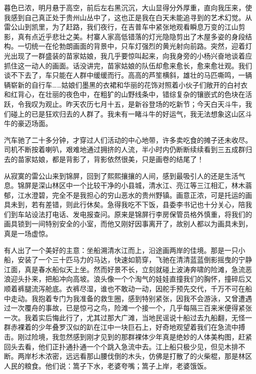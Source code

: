 \documentclass{article}
\begin{document}
暮色已浓，明月悬于高空，前后左右黑沉沉，大山显得分外厚重，直向我压来，使我感到自己真正处于贵州山丛中了，这也正是我在白天未能追寻到的艺术幻觉。从雷公山到凯里，为了赶路，我们夜行，在吉普车中紧张地观看瞬息万变的江山剪影，真有点近乎悲壮之美。村寨人家高低错落的灯光隐隐剪出了木屋多姿的身段结构。一切统一在伦勃朗画面的背景中，只车灯强烈的黄光射向前路。突然，迎着灯光出现了一群盛装的苗家姑娘，我几乎要惊叫起来，向我身旁的小杨兴奋地谈着应抓住这一动人的画面。话没讲完，苗家姑娘的队伍却愈来愈长，愈来愈壮观。我们谈不下去了，车只能在人群中缓缓而行。高高的芦笙横斜，雄壮的马匹嘶鸣，一辆辆崭新的自行车……姑娘们墨黑的衣裙和华丽的花饰对照着小伙子们敞开的白衬衣和红背心，在壮丽的夜色中，在粗犷的山野线条中，错综复杂的镶嵌式的色块在活跃，令我叹为观止。昨天农历七月十五，是新谷登场的吃新节；今天白天斗牛，我们碰上的已是狂欢归去的人群了。我未有一睹斗牛的好运气，我无法想象这山区斗牛的豪迈场面。

汽车驰了二十多分钟，才穿过人们活动的中心地带，许多卖吃食的摊子还未收尽。司机不断按着喇叭，艰难地通过拥挤的人流，半小时内仍断断续续看到三五成群归去的苗家姑娘，都是背影了，背影依然很美，只是画卷的结尾了！

从寂寞的雷公山来到锦屏，回到了熙熙攘攘的人间，感到最吸引人的还是生活气息。锦屏是深山林区中一个比较干净的小县城，清水江、亮江等三江相汇，林木蓊郁，江水澄碧，完全不是我担心的穷山恶水的贵州野镇。画意正浓，可是托运的画具未到，若有差错，则此行休矣。急得我吃不下饭，县委李书记也十分关心，陪我们到车站设法打电话、发电报查问。原来是锦屏行李房保管员格外慎重，将我们的画具锁到一间特别安全的小室，而他又刚好因事离开了，故别人都以为画具未到，真是一场虚惊。

有人出了一个美好的主意：坐船溯清水江而上，沿途画两岸的佳境。那是一只小船，安装了一个三十匹马力的马达，快速如箭穿，飞驰在清清蓝蓝倒影摇曳的宁静江面，真是春水船似天上坐。然而好景不长，立刻就碰上波涛奔啸的险滩，急流恶浪迎头扑来，把船冲向高坡。浪头像一个个淘气的娃娃直撞我们的胸怀，撞碎后又顺着裤腿流泻舱底。衣裤尽湿，谁也不敢动一动，因舵手预先交代，千万不可在船中走动。我抱着专门为我准备的救生圈，感到特别紧张，因我不会游泳，又曾遭遇过一次覆舟的事故，已是惊弓之鸟，险滩一个接一个，几乎每隔三百来米便得紧张一次。我着实后悔此行了，尤其过那大广滩，当地民谣说十船过去九船翻，无怪一群赤裸着的少年叠罗汉似的趴在江中一块巨石上，好奇地观望着我们在急流中搏击。刚过险境，我忽然感到刚才见到的那群裸体少年真是绝妙的人体美构图，赶紧回头去看，他们正扑通扑通一个个跳入急流中去。江上船只极少见，但见木排不断。两岸杉木浓密，远远看那山腰伐倒的木头，仿佛是打散了的火柴棍，那是林区人民的粮食。他们说：篙子下水，老婆夸嘴；篙子上岸，老婆饿饭。
\end{document}

